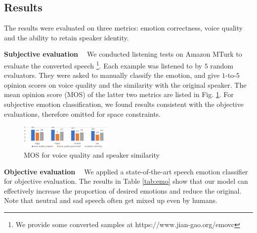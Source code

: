 \documentclass{article}
\begin{document}
\subsection{Results}
The results were evaluated on three metrics: emotion correctness, voice quality and the ability to retain speaker identity.

\noindent \textbf{Subjective evaluation \ } We conducted listening tests on Amazon MTurk to evaluate the converted speech \footnote{We provide some converted samples at https://www.jian-gao.org/emovc}. Each example was listened to by $5$ random evaluators. They were asked to manually classify the emotion, and give $1$-to-$5$ opinion scores on voice quality and the similarity with the original speaker. The mean opinion score (MOS) of the latter two metrics are listed in Fig. \ref{fig:mos}. For subjective emotion classification, we found results consistent with the objective evaluations, therefore omitted for space constraints.

\begin{figure}[htb]
\center
\includegraphics[width=0.4\textwidth]{FIG/MOS}
\caption{MOS for voice quality and speaker similarity}
\label{fig:mos}
\end{figure}

\noindent \textbf{Objective evaluation \ } We applied a state-of-the-art speech emotion classifier \cite{mirsamadi2017automatic} for objective evaluation. The results in Table \ref{tab:emo} show that our model can effectively increase the proportion of desired emotions and reduce the original. Note that neutral and sad speech often get mixed up even by humans.
\end{document}
